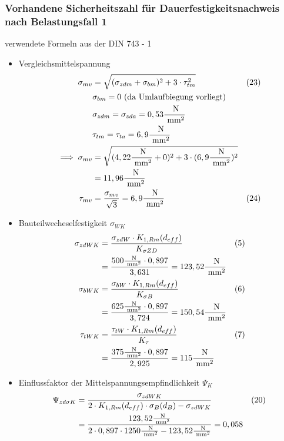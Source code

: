 \subsubsection{Vorhandene Sicherheitszahl für Dauerfestigkeitsnachweis nach Belastungsfall 1 }
verwendete Formeln aus der DIN 743 - 1
\begin{itemize}
	\item Vergleichsmittelspannung 
	\begin{align*}
	\sigma_{mv}&= \sqrt{(\sigma_{zdm} +\sigma_{bm} )^2+ 3 \cdot \tau_{tm}^2 } & (23) \\
	&\sigma_{bm}= 0 \text{ (da Umlaufbiegung vorliegt)} \\
	&\sigma_{zdm} = \sigma_{zda} = 0,53\frac{\text{ N}}{\text{ mm}^2} \\
	&\tau_{tm} = \tau_{ta} = 6,9 \frac{\text{ N}}{\text{ mm}^2} \\
	\implies \sigma_{mv}&= \sqrt{(4,22 \frac{\text{ N}}{\text{ mm}^2} +0 )^2+ 3 \cdot (6,9 \frac{\text{ N}}{\text{ mm}^2})^2 }  \\
	&= 11,96 \frac{\text{ N}}{\text{ mm}^2} \\
	\tau_{mv} &= \frac{\sigma_{mv}}{\sqrt{3}} = 6,9 \frac{\text{ N}}{\text{ mm}^2} & (24)
	\end{align*}
	\item Bauteilwecheselfestigkeit $\sigma_{WK}$ 
	\begin{align*}
	\sigma_{zdWK}&= \frac{\sigma_{zdW} \cdot K_{1,Rm} (d_{eff})}{K_{\sigma ZD}}  & (5)\\
	&=  \frac{500 \frac{\text{ N}}{\text{ mm}^2}\cdot 0,897}{3,631} = 123,52 \frac{\text{ N}}{\text{ mm}^2}\\
	\sigma_{bWK}&= \frac{\sigma_{bW} \cdot K_{1,Rm} (d_{eff})}{K_{\sigma B}}  & (6 )\\
	&=  \frac{625 \frac{\text{ N}}{\text{ mm}^2}\cdot 0,897}{3,724} = 150,54 \frac{\text{ N}}{\text{ mm}^2}\\
	\tau_{tWK}&= \frac{\tau_{tW} \cdot K_{1,Rm} (d_{eff})}{K_{\tau}} &(7) \\
	&=  \frac{375 \frac{\text{ N}}{\text{ mm}^2}\cdot 0,897}{2,925} = 115 \frac{\text{ N}}{\text{ mm}^2}
	\end{align*}
	\item Einflussfaktor der Mittelspannungsempfindlichkeit $\Psi_{K}$ 
	\begin{align*}
	\Psi_{zd \sigma K}&= \frac{\sigma_{zdWK}}{2 \x  K_{1,Rm} (d_{eff}) \x \sigma_B (d_B) -\sigma_{zdWK}}  &(20)\\
	&=  \frac{123,52 \frac{\text{ N}}{\text{ mm}^2}}{2 \x 0,897 \x 1250\frac{\text{ N}}{\text{ mm}^2} - 123,52 \frac{\text{ N}}{\text{ mm}^2}} = 0,058 \\

\end{align*}
\end{itemize}
